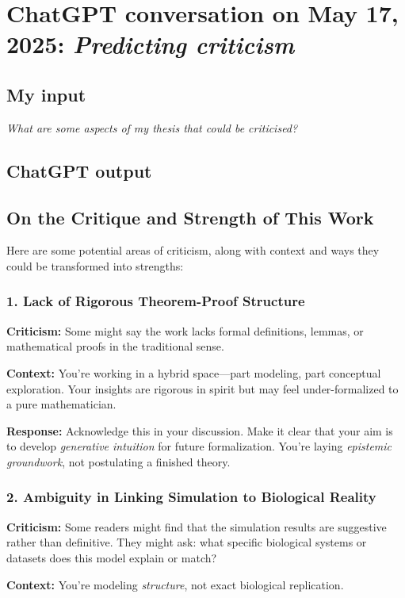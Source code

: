 \section{ChatGPT conversation on May 17, 2025: \textit{Predicting criticism}}

\subsection{My input}
\textit{What are some aspects of my thesis that could be criticised?}

\subsection{ChatGPT output}

\subsection*{On the Critique and Strength of This Work}

Here are some potential areas of criticism, along with context and ways they could be transformed into strengths:

\subsubsection*{1. Lack of Rigorous Theorem-Proof Structure}
\textbf{Criticism:} Some might say the work lacks formal definitions, lemmas, or mathematical proofs in the traditional sense.

\textbf{Context:} You're working in a hybrid space—part modeling, part conceptual exploration. Your insights are rigorous in spirit but may feel under-formalized to a pure mathematician.

\textbf{Response:} Acknowledge this in your discussion. Make it clear that your aim is to develop \textit{generative intuition} for future formalization. You’re laying \textit{epistemic groundwork}, not postulating a finished theory.

\subsubsection*{2. Ambiguity in Linking Simulation to Biological Reality}
\textbf{Criticism:} Some readers might find that the simulation results are suggestive rather than definitive. They might ask: what specific biological systems or datasets does this model explain or match?

\textbf{Context:} You’re modeling \textit{structure}, not exact biological replication.

